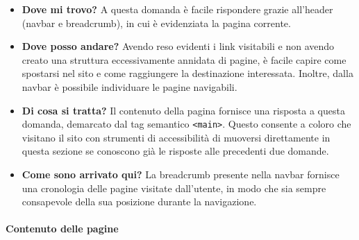 \begin{itemize}
    \item \textbf{Dove mi trovo?} A questa domanda è facile rispondere grazie all’header (navbar e breadcrumb), in cui è evidenziata la pagina corrente.
    \item \textbf{Dove posso andare?} Avendo reso evidenti i link visitabili e non avendo creato una struttura eccessivamente annidata di pagine, è facile capire come spostarsi nel sito e come raggiungere la destinazione interessata. Inoltre, dalla navbar è possibile individuare le pagine navigabili.
    \item \textbf{Di cosa si tratta?} Il contenuto della pagina fornisce una risposta a questa domanda, demarcato dal tag semantico \texttt{<main>}. Questo consente a coloro che visitano il sito con strumenti di accessibilità di muoversi direttamente in questa sezione se conoscono già le risposte alle precedenti due domande.
    \item \textbf{Come sono arrivato qui?} La breadcrumb presente nella navbar fornisce una cronologia delle pagine visitate dall’utente, in modo che sia sempre consapevole della sua posizione durante la navigazione.
\end{itemize}

\paragraph{Contenuto delle pagine} \label{contenuto}

